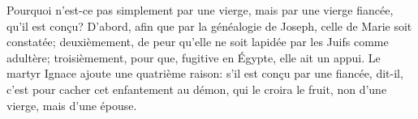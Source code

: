 Pourquoi n’est-ce pas simplement par une vierge,
	mais par une vierge fiancée, qu’il est conçu?
D’abord, afin que par la généalogie de Joseph, celle de Marie soit constatée;
	deuxièmement, de peur qu’elle ne soit lapidée par les Juifs comme adultère;
	troisièmement, pour que, fugitive en Égypte, elle ait un appui.
Le martyr Ignace ajoute une quatrième raison:
	s’il est conçu par une fiancée, dit-il,
	c’est pour cacher cet enfantement au démon,
	qui le croira le fruit, non d’une vierge, mais d’une épouse.
